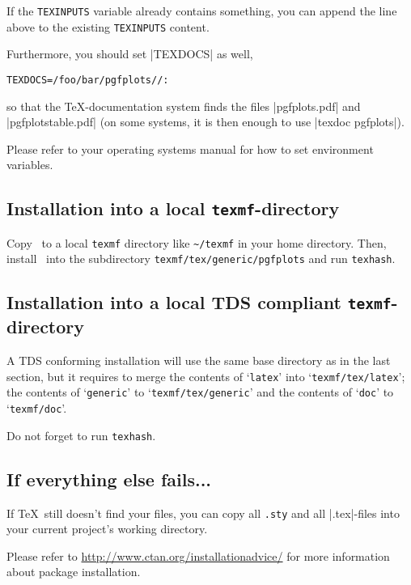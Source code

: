 If the \texttt{TEXINPUTS} variable already contains something, you can append the line above to the existing \texttt{TEXINPUTS} content.

Furthermore, you should set |TEXDOCS| as well,
\begin{lstlisting}
TEXDOCS=/foo/bar/pgfplots//:
\end{lstlisting}
so that the \TeX-documentation system finds the files |pgfplots.pdf| and |pgfplotstable.pdf| (on some systems, it is then enough to use |texdoc pgfplots|).

Please refer to your operating systems manual for how to set environment variables.

\subsection{Installation into a local \texttt{texmf}-directory}
Copy \PGFPlots\ to a local \texttt{texmf} directory like \lstinline!~/texmf! in your home directory. Then, install \PGFPlots\ into the subdirectory \lstinline!texmf/tex/generic/pgfplots! and run \lstinline!texhash!.

\subsection{Installation into a local TDS compliant \texttt{texmf}-directory}
A TDS conforming installation will use the same base directory as in the last section, but it requires to merge the contents of `\texttt{latex}' into `\texttt{texmf/tex/latex}'; the contents of `\texttt{generic}' to `\texttt{texmf/tex/generic}' and the contents of `\texttt{doc}' to `\texttt{texmf/doc}'.

Do not forget to run \lstinline!texhash!.

\subsection{If everything else fails...}
If \TeX\ still doesn't find your files, you can copy all \lstinline!.sty! and all |.tex|-files into your current project's working directory.

Please refer to \url{http://www.ctan.org/installationadvice/} for more information about package installation.



